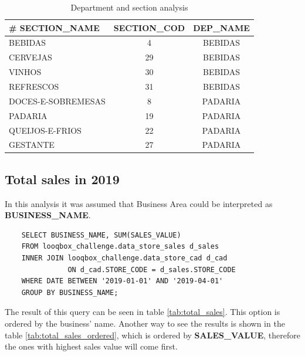 \documentclass[a4paper, 12pt]{article}
\begin{document}
\begin{table}[htb]
\centering
\begin{tabular}{lcc}
\hline
\# SECTION\_NAME   & \multicolumn{1}{l}{SECTION\_COD} & \multicolumn{1}{l}{DEP\_NAME} \\ \hline
BEBIDAS            & 4                                & BEBIDAS                       \\ \hline
CERVEJAS           & 29                               & BEBIDAS                       \\ \hline
VINHOS             & 30                               & BEBIDAS                       \\ \hline
REFRESCOS          & 31                               & BEBIDAS                       \\ \hline
DOCES-E-SOBREMESAS & 8                                & PADARIA                       \\ \hline
PADARIA            & 19                               & PADARIA                       \\ \hline
QUEIJOS-E-FRIOS    & 22                               & PADARIA                       \\ \hline
GESTANTE           & 27                               & PADARIA                       \\ \hline
\end{tabular}
\caption{Department and section analysis}
\label{tab:sections_table}
\end{table}

\newpage
\subsection{Total sales in 2019}
In this analysis it was assumed that Business Area could be interpreted as \textbf{BUSINESS\_NAME}.

\begin{verbatim}
    SELECT BUSINESS_NAME, SUM(SALES_VALUE)
    FROM looqbox_challenge.data_store_sales d_sales
    INNER JOIN looqbox_challenge.data_store_cad d_cad 
               ON d_cad.STORE_CODE = d_sales.STORE_CODE
    WHERE DATE BETWEEN '2019-01-01' AND '2019-04-01'
    GROUP BY BUSINESS_NAME;
\end{verbatim}

The result of this query can be seen in table \ref{tab:total_sales}. This option is ordered by the business' name. Another way to see the results is shown in the table \ref{tab:total_sales_ordered}, which is ordered by \textbf{SALES\_VALUE}, therefore the ones with highest sales value will come first.
\end{document}
